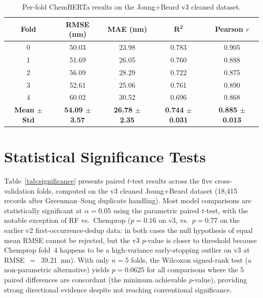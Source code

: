 \documentclass[journal=jcisd8,manuscript=suppinfo]{achemso}
\begin{document}
\begin{table}[htbp]
\centering
\caption{Per-fold ChemBERTa results on the Joung+Beard v3 cleaned dataset.}
\label{tab:perfold_chemberta}
\begin{tabular}{ccccc}
\toprule
\textbf{Fold} & \textbf{RMSE (nm)} & \textbf{MAE (nm)} & $\boldsymbol{R^2}$ & \textbf{Pearson $r$} \\
\midrule
0 & 50.03 & 23.98 & 0.783 & 0.905 \\
1 & 51.69 & 26.05 & 0.760 & 0.888 \\
2 & 56.09 & 28.29 & 0.722 & 0.875 \\
3 & 52.61 & 25.06 & 0.761 & 0.890 \\
4 & 60.02 & 30.52 & 0.696 & 0.868 \\
\midrule
\textbf{Mean $\pm$ Std} & \textbf{54.09 $\pm$ 3.57} & \textbf{26.78 $\pm$ 2.35} & \textbf{0.744 $\pm$ 0.031} & \textbf{0.885 $\pm$ 0.013} \\
\bottomrule
\end{tabular}
\end{table}


\section{Statistical Significance Tests}
\label{sec:significance}

Table~\ref{tab:significance} presents paired $t$-test results across the five cross-validation folds, computed on the v3 cleaned Joung+Beard dataset (18{,}415 records after Greenman--Song duplicate handling).
Most model comparisons are statistically significant at $\alpha = 0.05$ using the parametric paired $t$-test, with the notable exception of RF vs.\ Chemprop ($p = 0.16$ on v3, vs.\ $p = 0.77$ on the earlier v2 first-occurrence-dedup data: in both cases the null hypothesis of equal mean RMSE cannot be rejected, but the v3 $p$-value is closer to threshold because Chemprop fold~4 happens to be a high-variance early-stopping outlier on v3 at RMSE~$=$~39.21~nm).
With only $n = 5$ folds, the Wilcoxon signed-rank test (a non-parametric alternative) yields $p = 0.0625$ for all comparisons where the 5 paired differences are concordant (the minimum achievable $p$-value), providing strong directional evidence despite not reaching conventional significance.
\end{document}
